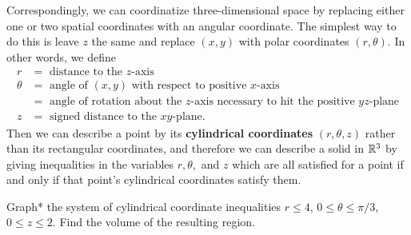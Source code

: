 \documentclass[svgnames]{watsonbook}
\begin{document}
Correspondingly, we can coordinatize three-dimensional space by
replacing either one or two spatial coordinates with an angular
coordinate. The simplest way to do this is leave $z$ the same and
replace $(x,y)$ with polar coordinates $(r,\theta)$. In other words,
we define
\begin{align*}
  r &= \text{ distance to the }z\text{-axis} \\
  \theta &= \text{ angle of } (x,y) \text{ with respect to positive
           }x\text{-axis} \\  &=
                                \text{ angle of rotation
                                about the }z\text{-axis necessary to hit the
                                positive }yz\text{-plane}  \\ 
  z &= \text{ signed distance to the }xy\text{-plane}. 
\end{align*}
Then we can describe a point by its \textbf{cylindrical coordinates}
$(r,\theta, z)$ rather than its rectangular coordinates, and therefore
we can describe a solid in $\mathbb{R}^3$ by giving inequalities in the
variables $r, \theta,$ and $z$ which are all satisfied for a point if
and only if that point's cylindrical coordinates satisfy them. 

\begin{example}{}{}
  Graph* the system of cylindrical coordinate inequalities $r \leq 4$,
  $0 \leq \theta \leq \pi/3$, $0 \leq z \leq 2$. Find the volume of
  the resulting region. 
\end{example}
\end{document}
